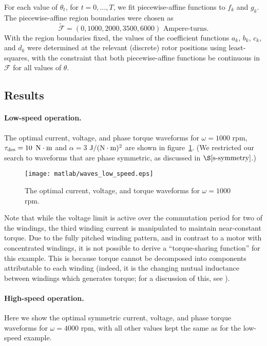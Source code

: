 \documentclass[11pt]{article}
\newif\ifarxiv
\begin{document}
For each value of $\theta_t$, for $t = 0, \ldots, T$,
we fit piecewise-affine functions to $f_k$ and $g_k$.
The piecewise-affine region boundaries were chosen as
\[
\tilde {\mathcal F} = (0, 1000, 2000, 3500, 6000) \text{ Ampere-turns}.
\]
With the region boundaries fixed,
the values of the coefficient functions $a_k$, $b_k$, $c_k$, and $d_k$
were determined at the relevant (discrete) rotor positions using least-squares,
with the constraint that both piecewise-affine functions be continuous
in $\mathcal F$ for all values of $\theta$.




\subsection{Results}

\paragraph{Low-speed operation.}
The optimal current, voltage, and phase torque waveforms
for $\omega = 1000$ rpm, $\tau_{\rm des} = 10$ $\rm N\cdot m$ and
$\alpha = 3$ $\rm J/(N\cdot m)^2$
are shown in figure~\ref{f-waves-low-speed}.
(We restricted our search to waveforms that are phase symmetric,
as discussed in $\S\ref{s-symmetry}$.)

\begin{figure} 
\begin{center}
\ifarxiv
\texttt{[image: waves\_low\_speed.eps]}
\else
\texttt{[image: matlab/waves\_low\_speed.eps]}
\fi
\caption{
The optimal current, voltage, and torque waveforms for
$\omega = 1000$ rpm.
}
\label{f-waves-low-speed}
\end{center}
\end{figure}

Note that while the voltage limit is active over the commutation period
for two of the windings,
the third winding current is manipulated to maintain near-constant torque.
Due to the fully pitched winding pattern,
and in contrast to a motor with concentrated windings, 
it is not possible to derive a ``torque-sharing function'' for this example.
This is because torque cannot be decomposed into components attributable to each winding
(indeed, it is the changing mutual inductance between windings which generates torque;
for a discussion of this, see \cite{mecrow1993fully}).

\paragraph{High-speed operation.}
Here we show the optimal symmetric
current, voltage, and phase torque waveforms
for $\omega = 4000$ rpm,
with all other values kept the same as for the low-speed example.
\end{document}
